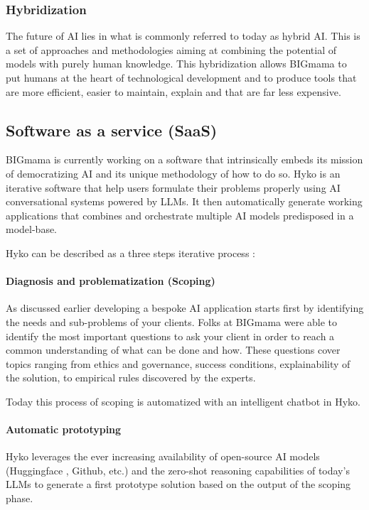 \documentclass[a4paper,12pt]{article}
\begin{document}
\subsubsection{Hybridization}
The future of AI lies in what is commonly referred to today as hybrid AI. 
This is a set of approaches and methodologies aiming at combining the potential of models with purely human knowledge. 
This hybridization allows BIGmama to put humans at the heart of technological development and to produce tools that are more efficient, easier to maintain, 
explain and that are far less expensive.

\subsection{Software as a service (SaaS)}
BIGmama is currently working on a software that intrinsically embeds its mission of democratizing AI and its unique methodology of how to do so. 
Hyko is an iterative software that help users formulate their problems properly using AI conversational systems powered by LLMs. 
It then automatically generate working applications that combines and orchestrate multiple AI models predisposed in a model-base.

Hyko can be described as a three steps iterative process :

\paragraph{Diagnosis and problematization (Scoping)}
As discussed earlier developing a bespoke AI application starts first by identifying the needs and sub-problems of your clients. 
Folks at BIGmama were able to identify the most important questions to ask your client in order to reach a common understanding of what can be done and how.
These questions cover topics ranging from ethics and governance, success conditions, explainability of the solution, to empirical rules discovered by the experts.

Today this process of scoping is automatized with an intelligent chatbot in Hyko. 

\paragraph{Automatic prototyping}
Hyko leverages the ever increasing availability of open-source AI models (Huggingface \cite{huggingface}, Github, etc.)
and the zero-shot reasoning capabilities \cite{zeroshot} of today's LLMs to generate a first prototype solution based on the output of the scoping phase.  
\end{document}
